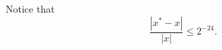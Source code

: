 \documentclass[letterpaper]{article}
\begin{document}
\begin{mdframed}
\begin{enumerate}[(1)]
\begin{mdframed}
            Notice that \[\frac{|x^* - x|}{|x|} \leq 2^{-24}.\]
        \end{mdframed}
    \end{enumerate}
    
\end{mdframed}
\end{document}
